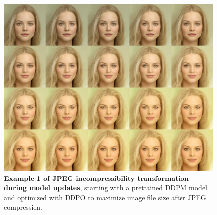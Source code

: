 \begin{appendixs}
        \begin{figure}
            \centering
            \includegraphics[scale=1.40]{img/results/incompressibility_8.png}
            \vspace{-0pt}  %
            \captionsetup{width=\textwidth} %
            \caption{\textbf{Example 1 of JPEG incompressibility transformation during model updates}, starting with a pretrained DDPM model and optimized with DDPO to maximize image file size after JPEG compression.}
            \label{fig:ddpm-to-ddpo-incompressibility-extra1}
        \end{figure}



\end{appendixs}
